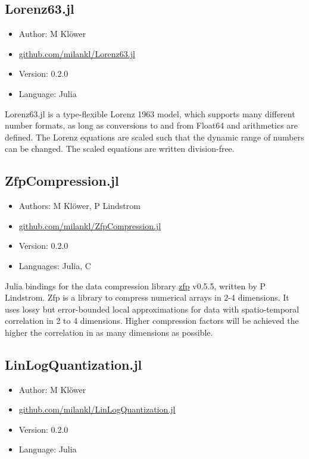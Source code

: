 \subsection{Lorenz63.jl}

\begin{itemize}
    \setlength\itemsep{-5pt}
    \item Author: M Klöwer
    \item \href{https://github.com/milankl/Lorenz63.jl}{github.com/milankl/Lorenz63.jl}
    \item Version: 0.2.0
    \item Language: Julia
\end{itemize}

Lorenz63.jl is a type-flexible Lorenz 1963 model, which supports many different number formats, as long as conversions to and from Float64 and arithmetics are defined.
The Lorenz equations are scaled such that the dynamic range of numbers can be changed. The scaled equations are written division-free.

\subsection{ZfpCompression.jl}

\begin{itemize}
    \setlength\itemsep{-5pt}
    \item Authors: M Klöwer, P Lindstrom
    \item \href{https://github.com/milankl/ZfpCompression.jl}{github.com/milankl/ZfpCompression.jl}
    \item Version: 0.2.0
    \item Languages: Julia, C
\end{itemize}

Julia bindings for the data compression library \href{https://github.com/LLNL/zfp}{zfp} v0.5.5, written by P Lindstrom. Zfp is a library to compress numerical arrays in
2-4 dimensions. It uses lossy but error-bounded local approximations for data with spatio-temporal correlation in 2 to 4 dimensions. Higher compression factors
will be achieved the higher the correlation in as many dimensions as possible.

\subsection{LinLogQuantization.jl}

\begin{itemize}
    \setlength\itemsep{-5pt}
    \item Author: M Klöwer
    \item \href{https://github.com/milankl/LinLogQuantization.jl}{github.com/milankl/LinLogQuantization.jl}
    \item Version: 0.2.0
    \item Language: Julia
\end{itemize}


